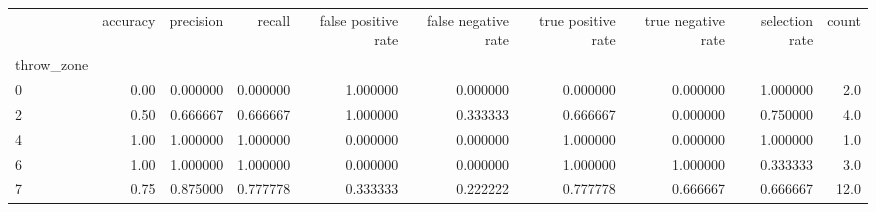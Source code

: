 \begin{tabular}{lrrrrrrrrr}
\toprule
{} &  accuracy &  precision &    recall &  false positive rate &  false negative rate &  true positive rate &  true negative rate &  selection rate &  count \\
throw\_zone &           &            &           &                      &                      &                     &                     &                 &        \\
\midrule
0          &      0.00 &   0.000000 &  0.000000 &             1.000000 &             0.000000 &            0.000000 &            0.000000 &        1.000000 &    2.0 \\
2          &      0.50 &   0.666667 &  0.666667 &             1.000000 &             0.333333 &            0.666667 &            0.000000 &        0.750000 &    4.0 \\
4          &      1.00 &   1.000000 &  1.000000 &             0.000000 &             0.000000 &            1.000000 &            0.000000 &        1.000000 &    1.0 \\
6          &      1.00 &   1.000000 &  1.000000 &             0.000000 &             0.000000 &            1.000000 &            1.000000 &        0.333333 &    3.0 \\
7          &      0.75 &   0.875000 &  0.777778 &             0.333333 &             0.222222 &            0.777778 &            0.666667 &        0.666667 &   12.0 \\
\bottomrule
\end{tabular}
